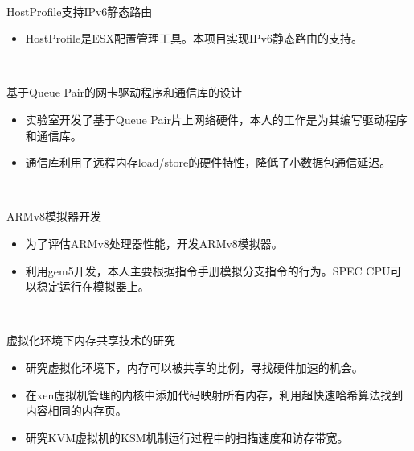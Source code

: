 \documentclass{resume}
\begin{document}
~\\
\begin{onehalfspacing}
HostProfile支持IPv6静态路由
\begin{itemize}
  \item HostProfile是ESX配置管理工具。本项目实现IPv6静态路由的支持。
\end{itemize}
\end{onehalfspacing}

~\\
\begin{onehalfspacing}
基于Queue Pair的网卡驱动程序和通信库的设计
\begin{itemize}
  \item 实验室开发了基于Queue Pair片上网络硬件，本人的工作是为其编写驱动程序和通信库。
  \item 通信库利用了远程内存load/store的硬件特性，降低了小数据包通信延迟。
\end{itemize}
\end{onehalfspacing}

~\\
\begin{onehalfspacing}
ARMv8模拟器开发
\begin{itemize}
  \item 为了评估ARMv8处理器性能，开发ARMv8模拟器。
  \item 利用gem5开发，本人主要根据指令手册模拟分支指令的行为。SPEC CPU可以稳定运行在模拟器上。
\end{itemize}
\end{onehalfspacing}

~\\
\begin{onehalfspacing}
虚拟化环境下内存共享技术的研究
\begin{itemize}
  \item 研究虚拟化环境下，内存可以被共享的比例，寻找硬件加速的机会。
  \item 在xen虚拟机管理的内核中添加代码映射所有内存，利用超快速哈希算法找到内容相同的内存页。
  \item 研究KVM虚拟机的KSM机制运行过程中的扫描速度和访存带宽。
\end{itemize}
\end{onehalfspacing}
\end{document}
